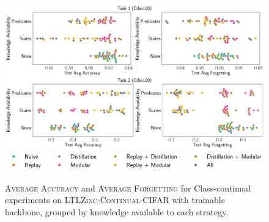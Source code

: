 \begin{figure}
	\centering
	\begin{minipage}{\linewidth}
		\includegraphics[width=\textwidth]{imgs/ltlzinc/swarm_cifar.pdf}\\
		\includegraphics[width=\textwidth]{imgs/ltlzinc/swarm_legend.pdf}
	\end{minipage}
	\caption[\textsc{Average Accuracy} and \textsc{Average Forgetting} on \textsc{LTLZinc-Continual-CIFAR}]{\textsc{Average Accuracy} and \textsc{Average Forgetting} for Class-continual experiments on \textsc{LTLZinc-Continual-CIFAR} with trainable backbone, grouped by knowledge available to each strategy.}
	\label{ltlzinc:fig:swarm-cifar}
\end{figure}

